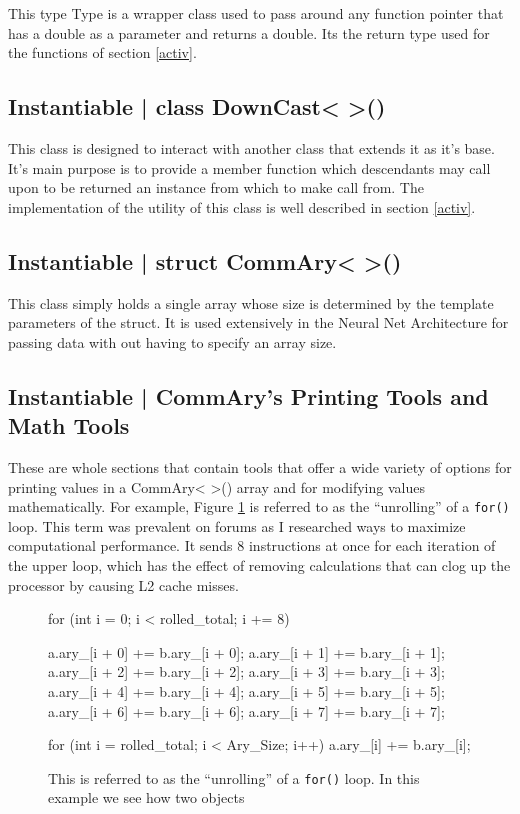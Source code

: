\documentclass[a4paper,10pt]{article}
\newcommand{\code}[1]{ {\fontfamily{lmtt}\fontseries{b}\selectfont
	#1}
}
\begin{document}
This type Type is a wrapper class used to pass around any function pointer that has a double as a parameter and
returns a double. Its the return type used for the functions of section \ref{activ}.

\subsection{Instantiable |\code{class DownCast< >()}} 

This class is designed to interact with another class that extends it as it's base. It's main purpose is to provide a
member function which descendants may call upon to be returned an instance from which to make call from. The
implementation of the utility of this class is well described in section \ref{activ}.

\subsection{Instantiable |\code{struct CommAry< >()}} 

This class simply holds a single array whose size is determined by the template parameters of the struct.  It is used
extensively in the Neural Net Architecture for passing data with out having to specify an array size.

\subsection{Instantiable |\code{CommAry's} Printing Tools and Math Tools}

These are whole sections that contain tools that offer a wide variety of options for printing values in a
\code{CommAry< >()} array and for modifying values mathematically.
For example, Figure \ref{fig:rolled}  is referred to as the ``unrolling'' of a \texttt{for()} loop. 
This term was prevalent on forums as I researched ways to maximize computational performance.  It sends 8   
instructions at once for each iteration of the upper loop, which has the effect of removing calculations that can clog 
up the processor by causing L2 cache misses.

\begin{figure}[H]
\begin{codebox}
				
for (int i = 0; i < rolled_total; i += 8) {
	
	a.ary_[i + 0] += b.ary_[i + 0];
	a.ary_[i + 1] += b.ary_[i + 1];
	a.ary_[i + 2] += b.ary_[i + 2];
	a.ary_[i + 3] += b.ary_[i + 3];
	a.ary_[i + 4] += b.ary_[i + 4];
	a.ary_[i + 5] += b.ary_[i + 5];
	a.ary_[i + 6] += b.ary_[i + 6];
	a.ary_[i + 7] += b.ary_[i + 7];
}
	
for (int i = rolled_total; i < Ary_Size; i++) {
	a.ary_[i] += b.ary_[i]; 
}

			
\end{codebox}
\caption{This is referred to as the ``unrolling'' of a \texttt{for()} loop. In this example we see how two objects }
\label{fig:rolled}

           
\end{figure}
\end{document}
